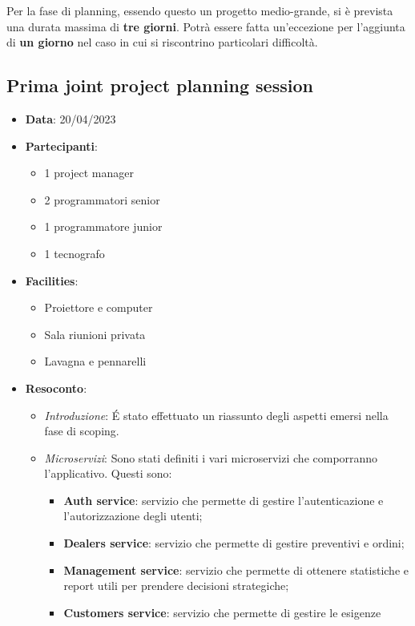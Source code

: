 \documentclass{article}
\begin{document}
  Per la fase di planning, essendo questo un progetto medio-grande, si è prevista una durata massima di 
    \textbf{tre giorni}. Potrà essere fatta un'eccezione per l'aggiunta di \textbf{un giorno} nel caso 
    in cui si riscontrino particolari difficoltà.

  \subsection{Prima joint project planning session}
  \begin{itemize}
    \item \textbf{Data}: 20/04/2023
    \item \textbf{Partecipanti}: 
    \begin{itemize}
      \item 1 project manager
      \item 2 programmatori senior
      \item 1 programmatore junior
      \item 1 tecnografo
    \end{itemize}
    \item \textbf{Facilities}:
    \begin{itemize}
      \item Proiettore e computer
      \item Sala riunioni privata
      \item Lavagna e pennarelli
    \end{itemize}
    \item \textbf{Resoconto}:
    \begin{itemize}
      \item \emph{Introduzione}:
        É stato effettuato un riassunto degli aspetti emersi nella fase di scoping.
      \item \emph{Microservizi}: 
        Sono stati definiti i vari microservizi che comporranno l'applicativo. 
        Questi sono:
        \begin{itemize}
          \item \textbf{Auth service}: servizio che permette di gestire 
            l’autenticazione e l’autorizzazione degli utenti;
          \item \textbf{Dealers service}: servizio che permette di gestire
            preventivi e ordini;
          \item \textbf{Management service}: servizio che permette di ottenere statistiche e
            report utili per prendere decisioni strategiche;
          \item \textbf{Customers service}: servizio che permette di gestire le esigenze 

\end{itemize}
\end{itemize}
\end{itemize}
\end{document}
